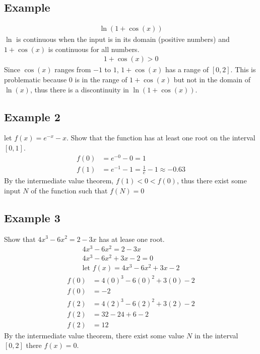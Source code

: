 \documentclass{article}
\theoremstyle{mytheoremstyle}
\theoremstyle{mytheoremstyle}
\theoremstyle{myproblemstyle}
\begin{document}
    \subsection*{Example}
    \begin{align*}
        \ln(1+\cos(x))
    \end{align*}
    $\ln$ is continuous when the input is in its domain (positive numbers) and
    $1+\cos(x)$ is continuous for all numbers.
    \begin{align*}
        1+\cos(x) > 0
    \end{align*}
    Since $\cos(x)$ ranges from $-1$ to $1$, $1+\cos(x)$ has a range of $[0,2]$.
    This is problematic because $0$ is in the range of $1+\cos(x)$ but not in
    the domain of $\ln(x)$, thus there is a discontinuity in $\ln(1+\cos(x))$.

    \subsection*{Example 2}
    let $f(x)=e^{-x}-x$. Show that the function has at least one root on the
    interval $[0,1]$.
    \begin{align*}
        f(0) &= e^{-0}-0 = 1 \\
        f(1) &= e^{-1}-1 = \frac{1}{e} - 1 \approx -0.63
    \end{align*}
    By the intermediate value theorem, $f(1) < 0 < f(0)$, thus there exist
    some input $N$ of the function such that $f(N) = 0$

    \subsection*{Example 3}
    Show that $4x^3 -6x^2 = 2 -3x$ has at lease one root.
    \begin{align*}
        4x^3 -6x^2 = 2 -3x \\
        4x^3 -6x^2 +3x -2 = 0 \\
        \text{let } f(x) = 4x^3 -6x^2 +3x -2
    \end{align*}
    \begin{align*}
        f(0) &= 4(0)^3 -6(0)^2 +3(0) -2 \\
        f(0) &= -2 \\
        f(2) &= 4(2)^3 -6(2)^2 +3(2) -2 \\
        f(2) &= 32 -24 +6 -2 \\
        f(2) &= 12
    \end{align*}
    By the intermediate value theorem, there exist some value $N$ in the
    interval $[0,2]$ there $f(x)=0$.
\end{document}
